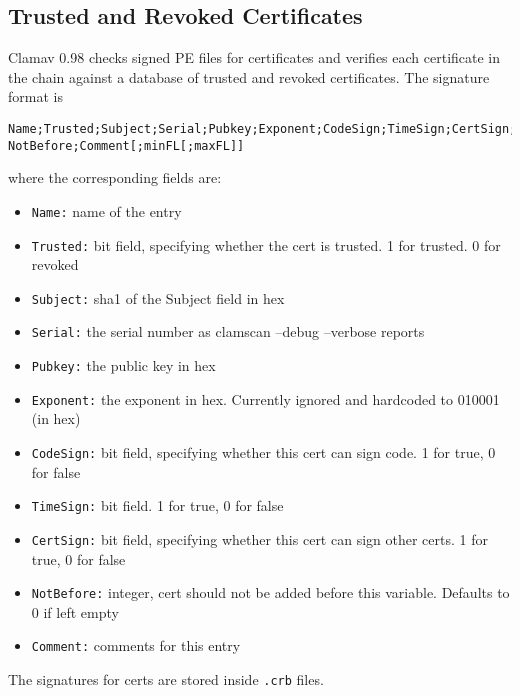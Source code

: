 \documentclass[a4paper,titlepage,12pt]{article}
\begin{document}
    \subsection{Trusted and Revoked Certificates}
    Clamav 0.98 checks signed PE files for certificates and verifies each
    certificate in the chain against a database of trusted and revoked
    certificates. The signature format is
\begin{verbatim}
Name;Trusted;Subject;Serial;Pubkey;Exponent;CodeSign;TimeSign;CertSign;
NotBefore;Comment[;minFL[;maxFL]]
\end{verbatim}
    where the corresponding fields are:
    \begin{itemize}
        \item \verb+Name:+ name of the entry
        \item \verb+Trusted:+ bit field, specifying whether the cert is
            trusted. 1 for trusted. 0 for revoked
        \item \verb+Subject:+ sha1 of the Subject field in hex
        \item \verb+Serial:+ the serial number as clamscan --debug --verbose
            reports
        \item \verb+Pubkey:+ the public key in hex
        \item \verb+Exponent:+ the exponent in hex. Currently ignored and
            hardcoded to 010001 (in hex)
        \item \verb+CodeSign:+ bit field, specifying whether this cert
            can sign code. 1 for true, 0 for false
        \item \verb+TimeSign:+ bit field. 1 for true, 0 for false
        \item \verb+CertSign:+ bit field, specifying whether this cert
            can sign other certs. 1 for true, 0 for false
        \item \verb+NotBefore:+ integer, cert should not be added before
            this variable. Defaults to 0 if left empty
        \item \verb+Comment:+ comments for this entry
    \end{itemize}
    The signatures for certs are stored inside \verb+.crb+ files.
\end{document}

